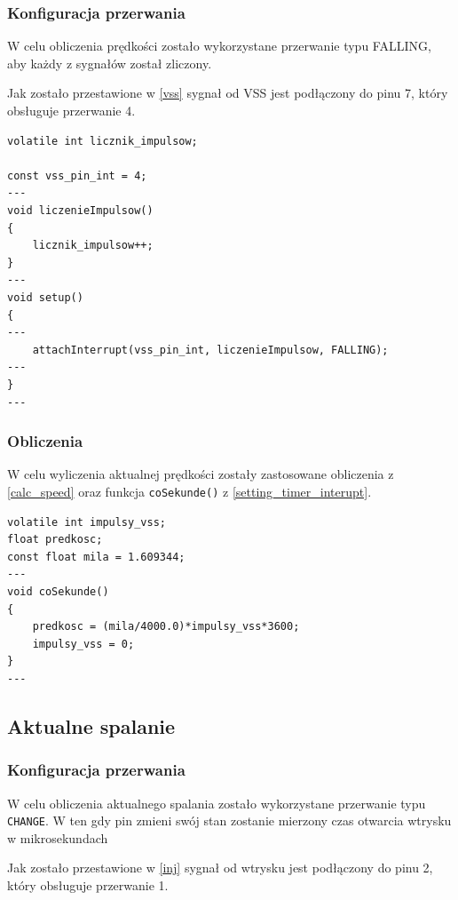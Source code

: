 \subsubsection{Konfiguracja przerwania}

W celu obliczenia prędkości zostało wykorzystane przerwanie typu FALLING, aby każdy z sygnałów został zliczony.

Jak zostało przestawione w \ref{vss} sygnał od VSS jest podłączony do pinu 7, który obsługuje przerwanie 4.

\begin{lstlisting}[label=list:vss_int,caption=Ustawianie przerwania VSS,
basicstyle=\footnotesize\ttfamily]
volatile int licznik_impulsow;

const vss_pin_int = 4;
---
void liczenieImpulsow()
{
    licznik_impulsow++;
}
---
void setup()
{
---
    attachInterrupt(vss_pin_int, liczenieImpulsow, FALLING);
---
}
---
\end{lstlisting}
\subsubsection{Obliczenia} \label{code_speed}

W celu wyliczenia aktualnej prędkości zostały zastosowane obliczenia z \ref{calc_speed} oraz funkcja \texttt{coSekunde()} z \ref{setting_timer_interupt}.

\begin{lstlisting}[label=list:vss_int,caption=Wyliczanie aktualnej prędkości,
basicstyle=\footnotesize\ttfamily]
volatile int impulsy_vss;
float predkosc;
const float mila = 1.609344;
---
void coSekunde()
{
    predkosc = (mila/4000.0)*impulsy_vss*3600;
    impulsy_vss = 0;
}
---
\end{lstlisting}

\subsection{Aktualne spalanie}
\subsubsection{Konfiguracja przerwania}

W celu obliczenia aktualnego spalania zostało wykorzystane przerwanie typu \texttt{CHANGE}. W ten gdy pin zmieni swój stan zostanie mierzony czas otwarcia wtrysku w mikrosekundach

Jak zostało przestawione w \ref{inj} sygnał od wtrysku jest podłączony do pinu 2, który obsługuje przerwanie 1.

